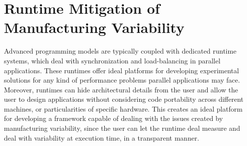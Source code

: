 \section{Runtime Mitigation of Manufacturing Variability}
Advanced programming models are typically coupled with dedicated runtime systems, which
deal with synchronization and load-balancing in parallel applications.  These runtimes
offer ideal platforms for developing experimental solutions for any kind of performance
problems parallel applications may face.  Moreover, runtimes can hide architectural
details from the user and allow the user to design applications without considering code
portability across different machines, or particularities of specific hardware.  This
creates an ideal platform for developing a framework capable of dealing with the issues
created by manufacturing variability, since the user can let the runtime deal measure and
deal with variability at execution time, in a transparent manner.

